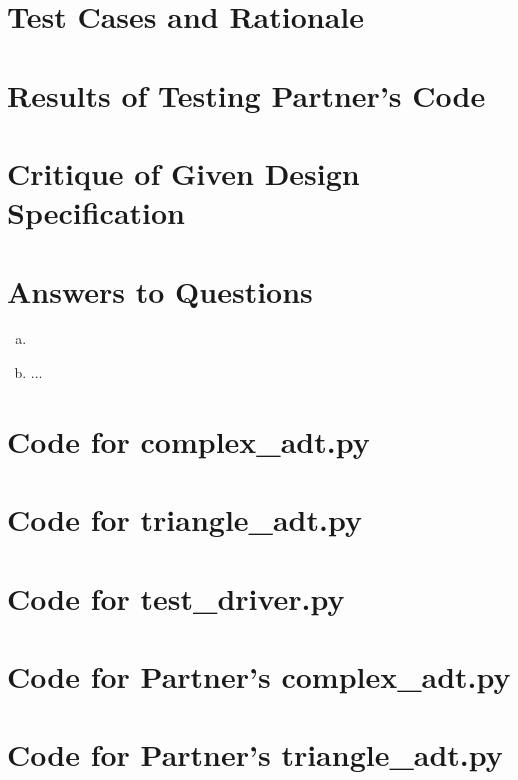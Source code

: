 \documentclass[12pt]{article}
\begin{document}
\section{Test Cases and Rationale} \label{Testing}


\section{Results of Testing Partner's Code}


\section{Critique of Given Design Specification}


\section{Answers to Questions}

\begin{enumerate}[(a)]

\item 
\item ...

\end{enumerate}

\newpage

\lstset{language=Python, basicstyle=\tiny, breaklines=true, showspaces=false,
  showstringspaces=false, breakatwhitespace=true}

\def\thesection{\Alph{section}}

\section{Code for complex\_adt.py}

\noindent 

\newpage

\section{Code for triangle\_adt.py}

\noindent 

\newpage

\section{Code for test\_driver.py}

\noindent 

\newpage

\section{Code for Partner's complex\_adt.py}

\noindent 

\section{Code for Partner's triangle\_adt.py}

\noindent 
\end{document}
